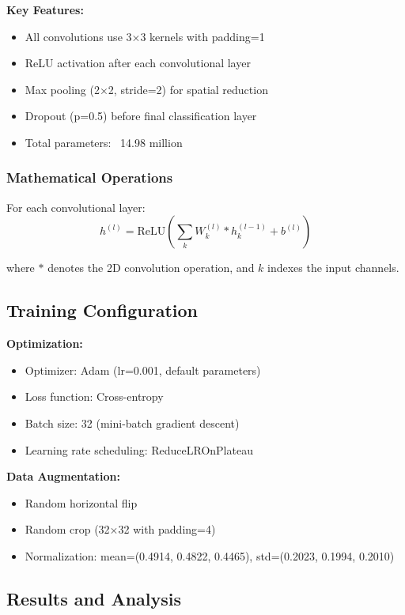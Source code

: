 \documentclass[11pt,a4paper]{article}
\begin{document}
\textbf{Key Features:}
\begin{itemize}
    \item All convolutions use 3×3 kernels with padding=1
    \item ReLU activation after each convolutional layer
    \item Max pooling (2×2, stride=2) for spatial reduction
    \item Dropout (p=0.5) before final classification layer
    \item Total parameters: ~14.98 million
\end{itemize}

\subsubsection{Mathematical Operations}

For each convolutional layer:
\begin{equation}
    h^{(l)} = \text{ReLU}\left(\sum_{k} W^{(l)}_k * h^{(l-1)}_k + b^{(l)}\right)
\end{equation}

where $*$ denotes the 2D convolution operation, and $k$ indexes the input channels.

\subsection{Training Configuration}

\textbf{Optimization:}
\begin{itemize}
    \item Optimizer: Adam (lr=0.001, default parameters)
    \item Loss function: Cross-entropy
    \item Batch size: 32 (mini-batch gradient descent)
    \item Learning rate scheduling: ReduceLROnPlateau
\end{itemize}

\textbf{Data Augmentation:}
\begin{itemize}
    \item Random horizontal flip
    \item Random crop (32×32 with padding=4)
    \item Normalization: mean=(0.4914, 0.4822, 0.4465), std=(0.2023, 0.1994, 0.2010)
\end{itemize}

\subsection{Results and Analysis}
\end{document}
